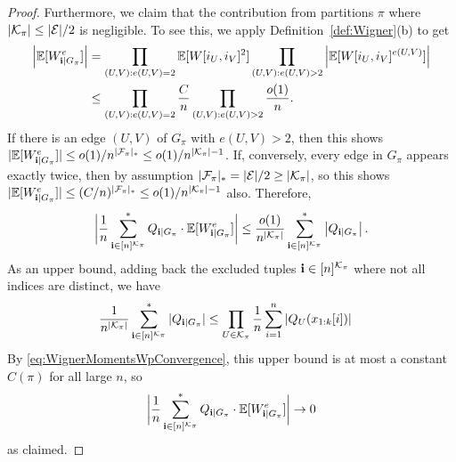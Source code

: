 \documentclass[10pt,reqno]{amsart}
\def\E{\mathbb{E}}
\def\cE{\mathcal{E}}
\def\bi{\mathbf{i}}
\begin{document}
\begin{proof}
Furthermore, we claim that the contribution from partitions $\pi$ where
$|\cK_\pi| \leq |\cE|/2$ is negligible.
To see this, we apply Definition~\ref{def:Wigner}(b) to get 
\begin{align*}
    \left|\EE[W_{\bi|G_\pi}^e]\right| &=
    \prod_{(U,V):e(U,V)=2} \EE[W[i_U,i_V]^2]
    \prod_{\substack{(U,V):e(U,V)>2}} \left|\EE[W[i_U,i_V]^{e(U,V)}]\right|\\
    &\leq \prod_{\substack{(U,V):e(U,V)=2}} \frac{C}{n}
    \prod_{\substack{(U,V):e(U,V)>2}} \frac{o(1)}{n}.
\end{align*}
If there is an edge $(U,V)$ of $G_\pi$ with $e(U,V)>2$, then this shows
$|\EE[W_{\bi|G_\pi}^e]| \leq o(1)/n^{|\cF_\pi|_*}
\leq o(1)/n^{|\cK_\pi|-1}$. If, conversely, every edge in $G_\pi$ appears exactly
twice, then by assumption $|\cF_\pi|_*=|\cE|/2 \geq |\cK_\pi|$,
so this shows $|\EE[W_{\bi|G_\pi}^e]| \leq (C/n)^{|\cF_\pi|_*}
\leq o(1)/n^{|\cK_\pi|-1}$ also. Therefore,
\[\bigg|\frac{1}{n}\sum_{\bi \in [n]^{\cK_\pi}}^* Q_{\bi|G_\pi}
\cdot \E[W_{\bi|G_\pi}^e]\bigg|
\leq \frac{o(1)}{n^{|\cK_\pi|}} \sum_{\ib \in
[n]^{\cK_\pi}}^* \left|Q_{\bi|G_\pi}\right|.\]
As an upper bound,
adding back the excluded tuples $\bi \in [n]^{\cK_\pi}$ where not all
indices are distinct, we have
\begin{align}
\frac{1}{n^{|\cK_\pi|}} \sum_{\ib \in [n]^{\cK_\pi}}^* |Q_{\bi|G_\pi}|
&\leq \prod_{U \in \cK_\pi} \frac{1}{n}
\sum_{i=1}^n |Q_U(x_{1:k}[i])|\label{eq:Qbound}
\end{align}
By \eqref{eq:WignerMomentsWpConvergence},
this upper bound is at most a constant $C(\pi)$ for all large $n$, so
\[\bigg|\frac{1}{n}\sum_{\bi \in [n]^{\cK_\pi}}^* Q_{\bi|G_\pi}
\cdot \E[W_{\bi|G_\pi}^e]\bigg| \to 0\]
as claimed.


\end{proof}
\end{document}
